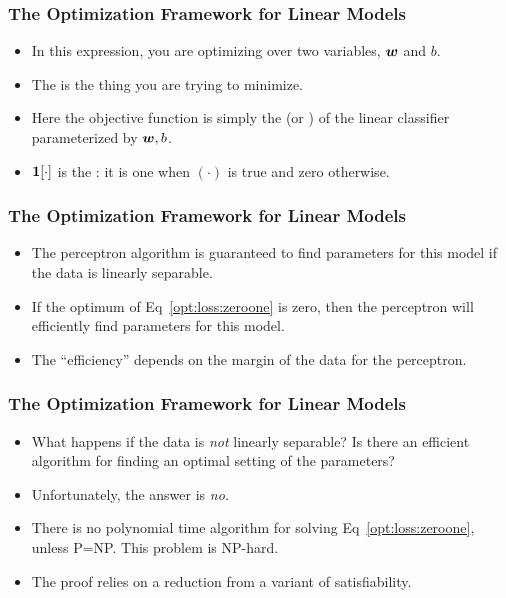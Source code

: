 \documentclass[trans]{beamer}
\begin{document}
\begin{frame}
  \frametitle{The Optimization Framework for Linear Models}
\begin{itemize}
\item 
In this expression, you are optimizing over two variables, ${\boldsymbol{w}}$ and
$b$. 
\item The  is the thing you are trying to
minimize. 
\item Here the objective function is simply the
 (or ) of the linear classifier
parameterized by ${\boldsymbol{w}},b$. 
\item $\boldsymbol{1}[\cdot]$ is the
: it is one when $(\cdot)$ is true and
zero otherwise.
\end{itemize}
\end{frame}


\begin{frame}
  \frametitle{The Optimization Framework for Linear Models}
\begin{itemize}
\item 
The perceptron algorithm is guaranteed to find parameters
for this model if the data is linearly separable.  
\item If
the optimum of Eq~\eqref{opt:loss:zeroone} is zero, then the
perceptron will efficiently find parameters for this model. 
\item The
 ``efficiency'' depends on the margin of the data for the
perceptron.
\end{itemize}
\end{frame}


\begin{frame}
  \frametitle{The Optimization Framework for Linear Models}
\begin{itemize}
\item 
What happens if the data is \emph{not} linearly
separable?  Is there an efficient algorithm for finding an optimal
setting of the parameters? 
\item Unfortunately, the answer is \emph{no.}
\item There is no polynomial time algorithm for solving
Eq~\eqref{opt:loss:zeroone}, unless P=NP.  This
problem is NP-hard.
\item  The proof  relies on a reduction from a
variant of satisfiability.
\end{itemize}
\end{frame}
\end{document}
